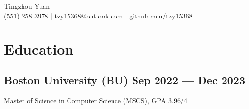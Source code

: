 \documentclass[a4,12pt]{article}
\newcommand{\hskills}[1]{
\textbf{\bfseries #1} }
\begin{document}
\vspace{-0.5cm}
\begin{center}
    \begin{minipage}[b]{0.7\textwidth}
            \centering
            {\huge Tingzhou Yuan} \\ %
            \vspace{0.1cm}
           (551) 258-3978  | tzy15368@outlook.com | github.com/tzy15368
    \end{minipage}%
    
\vspace{-0.35cm} 
\end{center}
\vspace{-1cm}

\section{\textbf{Education}}
\vspace{-0.2cm}
\subsection*{Boston University (BU)\hfill \textbf{ Sep 2022 --- Dec 2023 }}
Master of Science in Computer Science (MSCS), GPA 3.96/4\\
\end{document}
